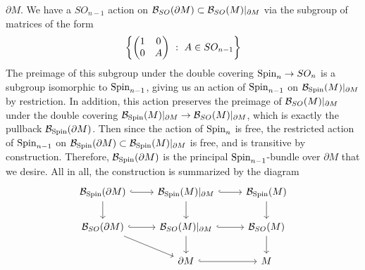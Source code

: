 $\partial M$. We have a $SO_{n-1}$ action on
$\mathcal{B}_{SO}(\partial M) \subset \mathcal{B}_{SO}(M)\vert_{\partial M}$ via the subgroup of
matrices of the form
\[
\left\lbrace \begin{pmatrix}
1 & 0 \\
0 & A
\end{pmatrix} ~ : ~ A \in SO_{n-1} \right\rbrace
\]
The preimage of this subgroup under the double covering $\mathrm{Spin}_n \to SO_n$ is
a subgroup isomorphic to $\mathrm{Spin}_{n-1}$, giving us an action of $\mathrm{Spin}_{n-1}$ on
$\mathcal{B}_{\mathrm{Spin}}(M)\vert_{\partial M}$ by restriction. In addition, this action
preserves the preimage of $\mathcal{B}_{SO}(M)\vert_{\partial M}$ under the double
covering $\mathcal{B}_{\mathrm{Spin}}(M)\vert_{\partial M} \to \mathcal{B}_{SO}(M)\vert_{\partial M}$,
which is exactly the pullback $\mathcal{B}_{\mathrm{Spin}}(\partial M)$. Then since the
action of $\mathrm{Spin}_n$ is free, the restricted action of $\mathrm{Spin}_{n-1}$ on
$\mathcal{B}_{\mathrm{Spin}}(\partial M) \subset \mathcal{B}_{\mathrm{Spin}}(M)\vert_{\partial M}$ is
free, and is transitive by construction. Therefore, $\mathcal{B}_{\mathrm{Spin}}(\partial M)$
is the principal $\mathrm{Spin}_{n-1}$-bundle over $\partial M$ that we desire. All in
all, the construction is summarized by the diagram
\[\begin{tikzcd}
\B_{\Spin}(\partial M) \ar[d] \ar[r, hookrightarrow] & \B_{\Spin}(M)\vert_{\partial M}
\ar[r, hookrightarrow]\ar[d] & \B_{\Spin}(M) \ar[d] \\
\B_{SO}(\partial M) \ar[r, hookrightarrow] \ar[dr] &\B_{SO}(M)\vert_{\partial M}
\ar[d] \ar[r, hookrightarrow] & \B_{SO}(M) \ar[d] \\
&\partial M \ar[r, hookrightarrow] & M
\end{tikzcd}\]
%
